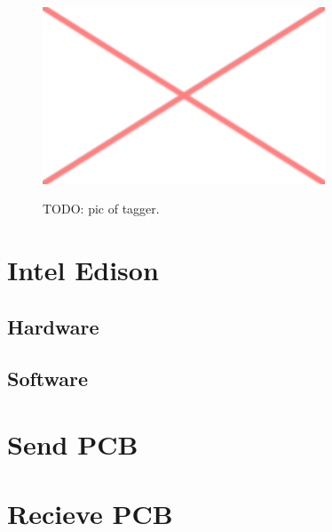 \begin{figure}[h!]
\centering
\includegraphics[width=0.75\textwidth]{images/placeholder.png}\\
\caption[Edison Tagger]{TODO: pic of tagger.}
\label{fig:tag_ed_pic}
\end{figure}

\section{Intel Edison}
\subsection{Hardware}
\subsection{Software}

\section{Send PCB}

\section{Recieve PCB}
